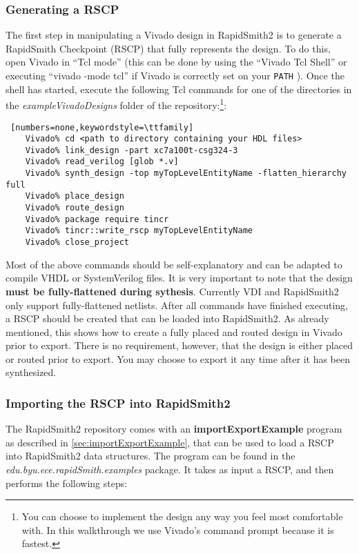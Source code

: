 \subsubsection{Generating a RSCP}  
The first step in manipulating a Vivado design in RapidSmith2 is to generate a
RapidSmith Checkpoint (RSCP) that fully represents the design. To do this, open
Vivado in ``Tcl mode'' (this can be done by using the ``Vivado Tcl Shell'' or
executing ``vivado -mode tcl'' if Vivado is correctly set on your \texttt{PATH}
). Once the shell has started, execute the following Tcl commands
for one of the directories in the \textit{exampleVivadoDesigns}
folder of the repository:\footnote{You can choose to implement the design any
way you feel most comfortable with. In this walkthrough we use Vivado's command
prompt because it is fastest.}:
                
\begin{lstlisting} [numbers=none,keywordstyle=\ttfamily]
	Vivado% cd <path to directory containing your HDL files>
	Vivado% link_design -part xc7a100t-csg324-3
	Vivado% read_verilog [glob *.v]
	Vivado% synth_design -top myTopLevelEntityName -flatten_hierarchy full 
	Vivado% place_design
	Vivado% route_design
	Vivado% package require tincr
	Vivado% tincr::write_rscp myTopLevelEntityName
	Vivado% close_project
\end{lstlisting}
Most of the above commands should be self-explanatory and can be adapted to
compile VHDL or SystemVerilog files.
It is very important to note that the design \textbf{must be fully-flattened
during sythesis}. Currently VDI and RapidSmith2 only support fully-flattened
netlists. After all commands have finished executing, a RSCP should be created
that can be loaded into RapidSmith2. As already mentioned, this shows how to
create a fully placed and routed design in Vivado prior to export.  There is no
requirement, however, that the design is either placed or routed prior to
export. You may choose to export it any time after it has been synthesized.

\subsubsection{Importing the RSCP into RapidSmith2}
The RapidSmith2 repository comes with an \textbf{importExportExample} program as
described in \autoref{sec:importExportExample}, that can be used to load a RSCP
into RapidSmith2 data structures. The program can be found in the
\textit{edu.byu.ece.rapidSmith.exa\-mples} package. It takes as input a RSCP,
and then performs the following steps:

